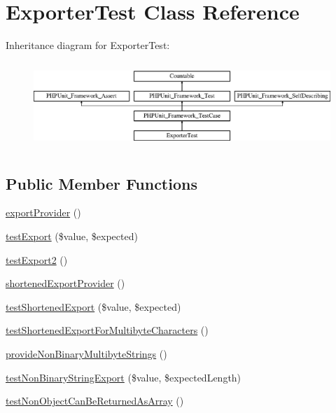 \hypertarget{class_sebastian_bergmann_1_1_exporter_1_1_exporter_test}{}\section{Exporter\+Test Class Reference}
\label{class_sebastian_bergmann_1_1_exporter_1_1_exporter_test}
Inheritance diagram for Exporter\+Test\+:\begin{figure}[H]
\begin{center}
\leavevmode
\includegraphics[height=3.303835cm]{class_sebastian_bergmann_1_1_exporter_1_1_exporter_test}
\end{center}
\end{figure}
\subsection*{Public Member Functions}
\begin{DoxyCompactItemize}
\item 
\mbox{\hyperlink{class_sebastian_bergmann_1_1_exporter_1_1_exporter_test_add35a282f6a37b192af6f57d0b4b708e}{export\+Provider}} ()
\item 
\mbox{\hyperlink{class_sebastian_bergmann_1_1_exporter_1_1_exporter_test_a255118348257c68b927a09241cf4ca02}{test\+Export}} (\$value, \$expected)
\item 
\mbox{\hyperlink{class_sebastian_bergmann_1_1_exporter_1_1_exporter_test_a0d1a5c5eaf0ad38ad66039a79264f90a}{test\+Export2}} ()
\item 
\mbox{\hyperlink{class_sebastian_bergmann_1_1_exporter_1_1_exporter_test_a1cf23fb712fc00d94b17cee4fb8d8f36}{shortened\+Export\+Provider}} ()
\item 
\mbox{\hyperlink{class_sebastian_bergmann_1_1_exporter_1_1_exporter_test_ab7e1f3815a94a86548b12c2a7e2db0ea}{test\+Shortened\+Export}} (\$value, \$expected)
\item 
\mbox{\hyperlink{class_sebastian_bergmann_1_1_exporter_1_1_exporter_test_a5ce245e94e6618db4fea4418b7db0951}{test\+Shortened\+Export\+For\+Multibyte\+Characters}} ()
\item 
\mbox{\hyperlink{class_sebastian_bergmann_1_1_exporter_1_1_exporter_test_af32a0b1a26838c675ca14724d0294b71}{provide\+Non\+Binary\+Multibyte\+Strings}} ()
\item 
\mbox{\hyperlink{class_sebastian_bergmann_1_1_exporter_1_1_exporter_test_ad016647e25435f14bcefedb31fb52972}{test\+Non\+Binary\+String\+Export}} (\$value, \$expected\+Length)
\item 
\mbox{\hyperlink{class_sebastian_bergmann_1_1_exporter_1_1_exporter_test_ac528498f8b5597e0eff88f37e31088d3}{test\+Non\+Object\+Can\+Be\+Returned\+As\+Array}} ()
\end{DoxyCompactItemize}
